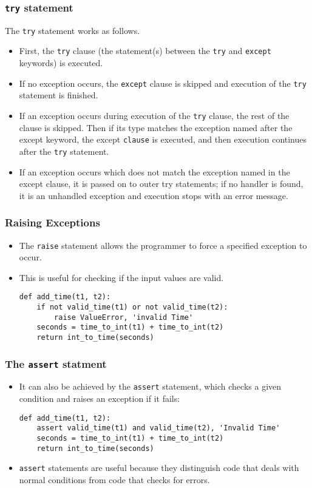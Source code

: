 \documentclass[handout]{beamer}
\newcommand{\beforeverb}{\footnotesize}
\newcommand{\afterverb}{\normalsize}
\begin{document}
\begin{frame}[fragile]
\frametitle{{\tt try} statement}
The {\tt try} statement works as follows. 

\begin{itemize}
\item First, the {\tt try} clause (the statement(s) between the {\tt try} and {\tt except} keywords) is executed. 
\item If no exception occurs, the {\tt except} clause is skipped and execution of the {\tt try} statement is finished.
\item If an exception occurs during execution of the {\tt try} clause, the rest of the clause is skipped. Then if its type matches the exception named after the except keyword, the except {\tt clause} is executed, and then execution continues after the {\tt try} statement.
\item  If an exception occurs which does not match the exception named in the except clause, it is passed on to outer try statements; if no handler is found, it is an \alert{unhandled exception} and execution stops with an error message.
\end{itemize}
\end{frame}
\begin{frame}[fragile]
\frametitle{ Raising Exceptions}
\begin{itemize}
\item The {\tt raise} statement allows the programmer to force a specified exception to occur. 

\item This is  useful for checking if the input values are valid.
\beforeverb
\begin{verbatim}
def add_time(t1, t2):
    if not valid_time(t1) or not valid_time(t2):
        raise ValueError, 'invalid Time'
    seconds = time_to_int(t1) + time_to_int(t2)
    return int_to_time(seconds)
\end{verbatim}
\afterverb
%
\end{itemize}
\end{frame}
\begin{frame}[fragile]
\frametitle{The {\tt assert} statment}
\begin{itemize}
\item It  can also be achieved by the {\tt assert} statement, which checks a given condition
and raises an \alert{exception} if it fails:
\scriptsize
\begin{verbatim}
def add_time(t1, t2):
    assert valid_time(t1) and valid_time(t2), 'Invalid Time'
    seconds = time_to_int(t1) + time_to_int(t2)
    return int_to_time(seconds)
\end{verbatim}
\afterverb
%
\item {\tt assert} statements are useful because they distinguish
code that deals with normal conditions from code
that checks for errors.

\end{itemize}
\end{frame}
\end{document}
